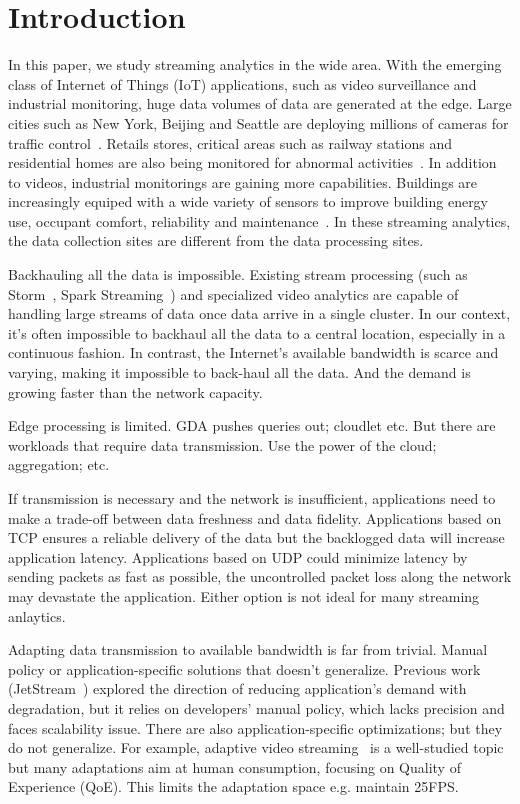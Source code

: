 \section{Introduction}

In this paper, we study streaming analytics in the wide area. With the emerging
class of Internet of Things (IoT) applications, such as video surveillance and
industrial monitoring, huge data volumes of data are generated at the edge.
Large cities such as New York, Beijing and Seattle are deploying millions of
cameras for traffic control~\cite{london.surveillance,skynet}. Retails stores,
critical areas such as railway stations and residential homes are also being
monitored for abnormal activities~\cite{connell2013retail, ronetti2000railway,
  dropcam}. In addition to videos, industrial monitorings are gaining more
capabilities. Buildings are increasingly equiped with a wide variety of sensors
to improve building energy use, occupant comfort, reliability and
maintenance~\cite{krioukov2012building}. In these streaming analytics, the data
collection sites are different from the data processing sites.

Backhauling all the data is impossible. Existing stream processing (such as
Storm~\cite{toshniwal2014storm}, Spark Streaming~\cite{zaharia2013discretized})
and specialized video analytics \cite{zhang2017live} are capable of handling
large streams of data once data arrive in a single cluster.  In our context,
it's often impossible to backhaul all the data to a central location, especially
in a continuous fashion.  In contrast, the Internet's available bandwidth is
scarce and varying, making it impossible to back-haul all the data. And the
demand is growing faster than the network capacity.

Edge processing is limited. GDA pushes queries out; cloudlet etc. But there are
workloads that require data transmission. Use the power of the cloud;
aggregation; etc.

If transmission is necessary and the network is insufficient, applications need
to make a trade-off between data freshness and data fidelity. Applications based
on TCP ensures a reliable delivery of the data but the backlogged data will
increase application latency. Applications based on UDP could minimize latency
by sending packets as fast as possible, the uncontrolled packet loss along the
network may devastate the application. Either option is not ideal for many
streaming anlaytics.

Adapting data transmission to available bandwidth is far from trivial. Manual
policy or application-specific solutions that doesn't generalize. Previous work
(JetStream~\cite{rabkin2014aggregation}) explored the direction of reducing
application's demand with degradation, but it relies on developers' manual
policy, which lacks precision and faces scalability issue.  There are also
application-specific optimizations; but they do not generalize. For example,
adaptive video streaming~\cite{yin2015control} is a well-studied topic but many
adaptations aim at human consumption, focusing on Quality of Experience
(QoE). This limits the adaptation space e.g. maintain 25FPS.

